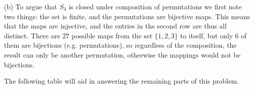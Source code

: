 \documentclass[12pt, a4paper]{article}
\begin{document}
\begin{flushleft}
\begin{flushleft}
\end{flushleft}

\begin{flushleft}

\hspace*{10mm}(b) To argue that $S_3$ is closed under composition of permutations we first\linebreak
\hspace*{16.7mm}note two things: the set is finite, and the permutations are bijective maps. \linebreak
\hspace*{16.7mm}This means that the maps are injective, and the entries in the second row \linebreak
\hspace*{16.7mm}are thus all distinct. There are $27$ possible maps from the set $\{1,2,3\}$ to\linebreak
\hspace*{16.7mm}itself, but only $6$ of them are bijections (e.g. permutations), so regardless\linebreak
\hspace*{16.7mm}of the composition, the result can only be another permutation, otherwise the\linebreak
\hspace*{16.7mm}mappings would not be bijections.\vspace*{3mm}\linebreak

\hspace*{16.7mm}The following table will aid in answering the remaining parts of this problem.\vspace*{5mm}
\linebreak

\end{flushleft}




\end{flushleft}
\end{document}
